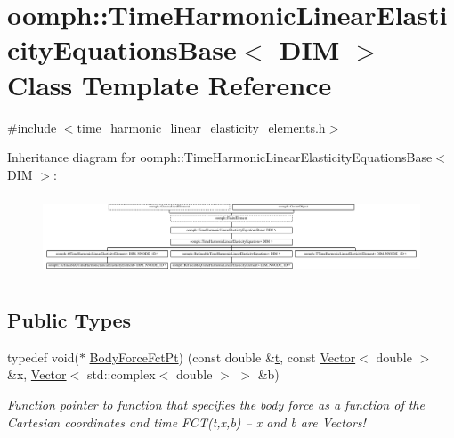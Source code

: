 \hypertarget{classoomph_1_1TimeHarmonicLinearElasticityEquationsBase}{}\section{oomph\+:\+:Time\+Harmonic\+Linear\+Elasticity\+Equations\+Base$<$ D\+IM $>$ Class Template Reference}
\label{classoomph_1_1TimeHarmonicLinearElasticityEquationsBase}


{\ttfamily \#include $<$time\+\_\+harmonic\+\_\+linear\+\_\+elasticity\+\_\+elements.\+h$>$}

Inheritance diagram for oomph\+:\+:Time\+Harmonic\+Linear\+Elasticity\+Equations\+Base$<$ D\+IM $>$\+:\begin{figure}[H]
\begin{center}
\leavevmode
\includegraphics[height=2.398287cm]{classoomph_1_1TimeHarmonicLinearElasticityEquationsBase}
\end{center}
\end{figure}
\subsection*{Public Types}
\begin{DoxyCompactItemize}
\item 
typedef void($\ast$ \hyperlink{classoomph_1_1TimeHarmonicLinearElasticityEquationsBase_a8cff2941bd4dc9fd3714c151cf5b6e33}{Body\+Force\+Fct\+Pt}) (const double \&\hyperlink{cfortran_8h_af6f0bd3dc13317f895c91323c25c2b8f}{t}, const \hyperlink{classoomph_1_1Vector}{Vector}$<$ double $>$ \&x, \hyperlink{classoomph_1_1Vector}{Vector}$<$ std\+::complex$<$ double $>$ $>$ \&b)
\begin{DoxyCompactList}\small\item\em Function pointer to function that specifies the body force as a function of the Cartesian coordinates and time F\+C\+T(t,x,b) -- x and b are Vectors! \end{DoxyCompactList}\end{DoxyCompactItemize}
